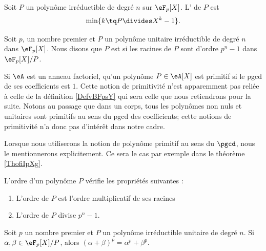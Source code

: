 \begin{definition}\label{DefvBFpsY}
    Soit \( P\) un polynôme irréductible de degré \( n\) sur \( \eF_p[X]\). L' de \( P\) est
    \begin{equation}
        \min\{ k\tq P\divides X^k-1 \}.
    \end{equation}

    Soit \( p\), un nombre premier et \( P\) un polynôme unitaire irréductible de degré $n$ dans \( \eF_p[X]\). Nous disons que \( P\) est  si les racines de \( P\) sont d'ordre \( p^n-1\) dans \( \eF_p[X]/P\).
\end{definition}

\begin{remark}  \label{RemwwJbYP}
    Si \( \eA\) est un anneau factoriel,  qu'un polynôme \( P\in \eA[X]\) est primitif si le pgcd de ses coefficients est \( 1\). Cette notion de primitivité n'est apparemment pas reliée à celle de la définition \ref{DefvBFpsY} qui sera celle que nous retiendrons pour la suite. Notons au passage que dans un corps, tous les polynômes non nuls et unitaires sont primitifs au sens du pgcd des coefficients; cette notions de primitivité n'a donc pas d'intérêt dans notre cadre.

    Lorsque nous utiliserons la notion de polynôme primitif au sens du \( \pgcd\), nous le mentionnerons explicitement. Ce sera le cas par exemple dans le théorème \ref{ThofiIpXg}.
\end{remark}

\begin{proposition}
    L'ordre d'un polynôme \( P\) vérifie les propriétés suivantes :
    \begin{enumerate}
        \item
            L'ordre de \( P\) est l'ordre multiplicatif de ses racines
        \item
            L'ordre de \( P\) divise \( p^n-1\).
    \end{enumerate}
\end{proposition}

\begin{lemma}       \label{LemZrUUOz}
    Soit \( p\) un nombre premier et \( P\) un polynôme irréductible unitaire de degré \( n\). Si \( \alpha,\beta\in \eF_p[X]/P\), alors \( (\alpha+\beta)^p=\alpha^p+\beta^p\).
\end{lemma}

